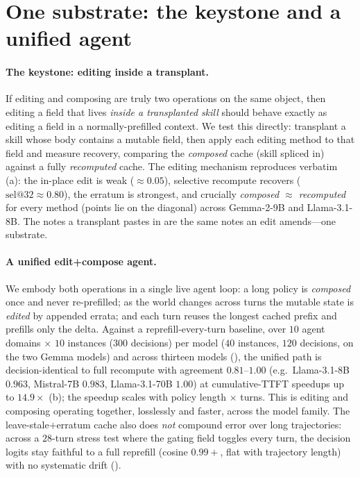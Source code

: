 \section{One substrate: the keystone and a unified agent}
\label{sec:keystone}

\paragraph{The keystone: editing inside a transplant.} If editing and composing are truly two operations
on the same object, then editing a field that lives \emph{inside a transplanted skill} should behave
exactly as editing a field in a normally-prefilled context. We test this directly: transplant a skill
whose body contains a mutable field, then apply each editing method to that field and measure recovery,
comparing the \emph{composed} cache (skill spliced in) against a fully \emph{recomputed} cache. The
editing mechanism reproduces verbatim (a): the in-place edit is weak ($\approx 0.05$),
selective recompute recovers ($\mathrm{sel}@32 \approx 0.80$), the erratum is strongest, and crucially
\emph{composed $\approx$ recomputed} for every method (points lie on the diagonal) across Gemma-2-9B and
Llama-3.1-8B. The notes a transplant pastes in are the same notes an edit amends---one substrate.

\paragraph{A unified edit+compose agent.} We embody both operations in a single live agent loop: a long
policy is \emph{composed} once and never re-prefilled; as the world changes across turns the mutable state
is \emph{edited} by appended errata; and each turn reuses the longest cached prefix and prefills only the
delta. Against a reprefill-every-turn baseline, over $10$ agent domains $\times$ $10$ instances ($300$
decisions) per model ($40$ instances, $120$ decisions, on the two Gemma models) and across thirteen
models (), the unified path is decision-identical to full recompute
with agreement $0.81$--$1.00$ (e.g.\ Llama-3.1-8B $0.963$, Mistral-7B $0.983$, Llama-3.1-70B $1.00$) at
cumulative-TTFT speedups up to $14.9\times$ (b); the speedup scales with policy length
$\times$ turns. This is editing and composing operating together, losslessly and faster, across the model
family. The leave-stale$+$erratum cache also does \emph{not} compound error over long trajectories: across
a $28$-turn stress test where the gating field toggles every turn, the decision logits stay faithful to a
full reprefill (cosine $0.99{+}$, flat with trajectory length) with no systematic drift
().


